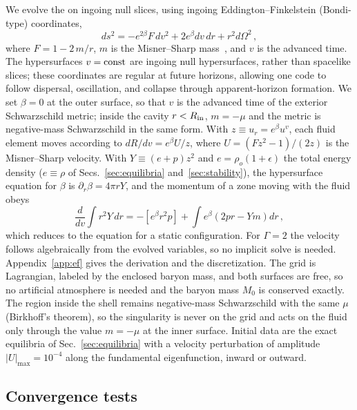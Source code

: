 \documentclass[%
 reprint,
 amsmath,amssymb,
 aps,prd,
 superscriptaddress,
]{revtex4-2}
\begin{document}
We evolve the  on ingoing null slices, using ingoing Eddington--Finkelstein (Bondi-type) coordinates,
\begin{equation}
ds^2=-e^{2\beta}F\,dv^2+2e^{\beta}dv\,dr+r^2d\Omega^2\,,
\label{eq:efmetric}
\end{equation}
where $F=1-2\,m/r$, $m$ is the Misner--Sharp mass~\cite{MisnerSharp1964}, and $v$ is the advanced time. The hypersurfaces $v={\rm const}$ are ingoing null hypersurfaces, rather than spacelike slices; these coordinates are regular at future horizons, allowing one code to follow dispersal, oscillation, and collapse through apparent-horizon formation. We set $\beta=0$ at the outer surface, so that $v$ is the advanced time of the exterior Schwarzschild metric; inside the cavity $r<R_{\rm in}$, $m=-\mu$ and the metric is negative-mass Schwarzschild in the same form. With $z\equiv u_r=e^\beta u^v$, each fluid element moves according to $dR/dv=e^\beta U/z$, where $U=(Fz^2-1)/(2z)$ is the Misner--Sharp velocity. With $Y\equiv(e+p)z^2$ and $e=\rho_o(1+\epsilon)$ the total energy density ($e\equiv\rho$ of Secs.~\ref{sec:equilibria} and~\ref{sec:stability}), the hypersurface equation for $\beta$ is $\partial_r\beta=4\pi rY$, and the momentum of a zone moving with the fluid obeys
\begin{equation}
\frac{d}{dv}\int r^2Y\,dr=-\left[e^\beta r^2p\right]+\int e^\beta\left(2pr-Ym\right)dr\,,
\label{eq:efmomentum}
\end{equation}
which reduces to the \tov{} equation for a static configuration. For $\Gamma=2$ the velocity follows algebraically from the evolved variables, so no implicit solve is needed. Appendix~\ref{app:ef} gives the derivation and the discretization. The grid is Lagrangian, labeled by the enclosed baryon mass, and both surfaces are free, so no artificial atmosphere is needed and the baryon mass $M_0$ is conserved exactly. The region inside the shell remains negative-mass Schwarzschild with the same $\mu$ (Birkhoff's theorem), so the singularity is never on the grid and acts on the fluid only through the value $m=-\mu$ at the inner surface. Initial data are the exact equilibria of Sec.~\ref{sec:equilibria} with a velocity perturbation of amplitude $|U|_{\max}=10^{-4}$ along the fundamental eigenfunction, inward or outward.

\subsection{Convergence tests}
\label{sec:linear}
\end{document}
